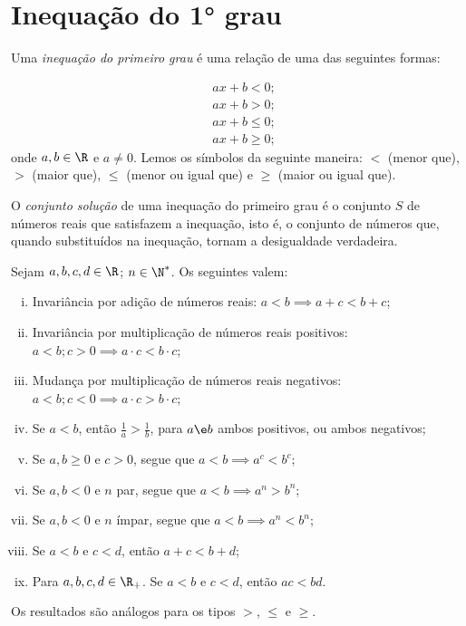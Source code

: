 \section{Inequação do 1° grau}

\begin{definition}
Uma \emph{inequação do primeiro grau} é uma relação de uma das seguintes formas:

\begin{align*}
& ax+b <0;\\
& ax+b >0;\\
& ax+b \le 0;\\
& ax+b \ge 0;
\end{align*}
%
onde $a, b \in \R$ e $ a \neq 0$. Lemos os símbolos da seguinte maneira: $<$ (menor que), $>$ (maior que), $\leq$ (menor ou igual
que) e $\geq$ (maior ou igual que).
\end{definition}

\begin{remark}
O \emph{conjunto solução} de uma inequação do primeiro grau é o conjunto $S$ de números reais que satisfazem a inequação, isto é, o conjunto de números que, quando substituídos na inequação, tornam a desigualdade verdadeira.
\end{remark}

\begin{proposition}
Sejam $a, b, c, d \in \R$; $n \in \N^*$. Os seguintes valem:
%
\begin{enumerate}[i.]
  \item Invariância por adição de números reais: $a < b \implies a+c < b+c$;
  \item Invariância por multiplicação de números reais positivos:  $a < b ; c>0 \implies a \cdot c < b \cdot c$;
  \item Mudança por multiplicação de números reais negativos: $a < b ; c<0 \implies a \cdot c > b \cdot c$;
  \item Se $a < b$, então $\frac 1 a > \frac 1 b$, para $a \e b$ ambos positivos, ou ambos negativos;
  \item Se $a,b \geq 0$ e $c>0$, segue que $a < b \implies a^c < b^c$;
  \item Se $a,b < 0$ e $n$ par, segue que $a < b \implies a^n > b^n$;
  \item Se $a,b < 0$ e $n$ ímpar, segue que $a < b \implies a^n < b^n$;
  \item Se $a< b$ e $c< d$, então $a+c < b+d$;
  \item Para $a, b, c, d \in \R_+$. Se $a< b$ e $c< d$, então $ac < bd$.
\end{enumerate}
%
Os resultados são análogos para os tipos $>$, $\leq$ e $\geq$.
\end{proposition}

